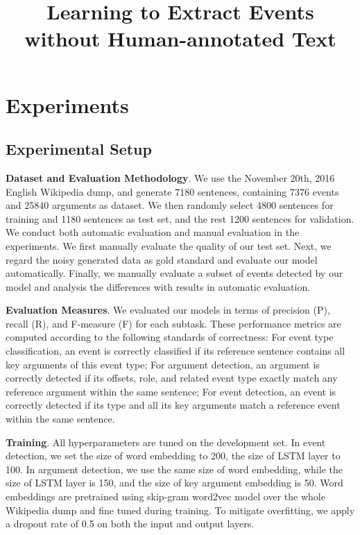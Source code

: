 \documentclass{article}
\title{Learning to Extract Events without Human-annotated Text}
\begin{document}
\maketitle









\section{Experiments}
\subsection{Experimental Setup}
\textbf{Dataset and Evaluation Methodology}. We use the November 20th, 2016 English Wikipedia dump, and generate 7180 sentences, containing 7376 events and 25840 arguments as dataset. We then randomly select 4800 sentences for training and 1180 sentences as test set, and the rest 1200 sentences for validation. We conduct both automatic evaluation and manual evaluation in the experiments. We first manually evaluate the quality of our test set. Next, we regard the noisy generated data as gold standard and evaluate our model automatically. Finally, we manually evaluate a subset of events detected by our model and analysis the differences with results in automatic evaluation.

\noindent \textbf{Evaluation Measures}. We evaluated our models in terms of precision (P), recall (R), and F-measure (F) for each subtask. These performance metrics are computed according to the following standards of correctness: For event type classification, an event is correctly classified if its reference sentence contains all key arguments of this event type; For argument detection, an argument is correctly detected if its offsets, role, and related event type exactly match any reference argument within the same sentence; For event detection, an event is correctly detected if its type and all its key arguments match a reference event within the same sentence.

\noindent \textbf{Training}. All hyperparameters are tuned on the development set. In event detection, we set the size of word embedding to 200, the size of LSTM layer to 100. In argument detection, we use the same size of word embedding, while the size of LSTM layer is 150, and the size of key argument embedding is 50. Word embeddings are pretrained using skip-gram word2vec model \cite{mikolov2013distributed} over the whole Wikipedia dump and fine tuned during training. To mitigate overfitting, we apply a dropout rate of 0.5 on both the input and output layers.
\end{document}
